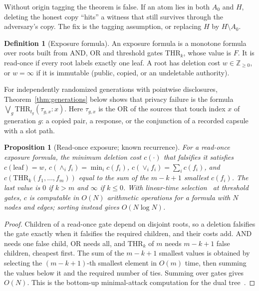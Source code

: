 \documentclass[pdflatex,sn-mathphys-num]{sn-jnl}
\theoremstyle{plain}
\newtheorem{proposition}[theorem]{Proposition}
\theoremstyle{definition}
\newtheorem{definition}[theorem]{Definition}
\begin{document}
Without origin tagging the theorem is false. If an atom lies in both $A_0$ and $H$, deleting the honest copy ``hits'' a witness that still survives through the adversary's copy. The fix is the tagging assumption, or replacing $H$ by $H\setminus A_0$.

\begin{definition}[Exposure formula]
An exposure formula is a monotone formula over roots built from AND, OR and threshold gates $\mathrm{THR}_k$, whose value is $F$. It is read-once if every root labels exactly one leaf. A root has deletion cost $w\in\mathbb{Z}_{\ge0}$, or $w=\infty$ if it is immutable (public, copied, or an undeletable authority).
\end{definition}

For independently randomized generations with pointwise disclosures, Theorem~\ref{thm:generations} below shows that privacy failure is the formula $\bigvee_g\mathrm{THR}_{t_g}(\tau_{g,x}:x)$. Here $\tau_{g,x}$ is the OR of the sources that touch index $x$ of generation $g$: a copied pair, a response, or the conjunction of a recorded capsule with a slot path.

\begin{proposition}[Read-once exposure; known recurrence]\label{prop:readonce}
For a read-once exposure formula, the minimum deletion cost $c(\cdot)$ that falsifies it satisfies $c(\text{leaf})=w$, $c(\wedge_i f_i)=\min_i c(f_i)$, $c(\vee_i f_i)=\sum_i c(f_i)$, and $c(\mathrm{THR}_k(f_1,\dots,f_m))$ equal to the sum of the $m-k+1$ smallest $c(f_i)$. The last value is $0$ if $k>m$ and $\infty$ if $k\le0$. With linear-time selection~\cite{blum1973} at threshold gates, $c$ is computable in $O(N)$ arithmetic operations for a formula with $N$ nodes and edges; sorting instead gives $O(N\log N)$.
\end{proposition}
\begin{proof}
Children of a read-once gate depend on disjoint roots, so a deletion falsifies the gate exactly when it falsifies the required children, and their costs add. AND needs one false child, OR needs all, and $\mathrm{THR}_k$ of $m$ needs $m-k+1$ false children, cheapest first. The sum of the $m-k+1$ smallest values is obtained by selecting the $(m-k+1)$-th smallest element in $O(m)$ time, then summing the values below it and the required number of ties. Summing over gates gives $O(N)$. This is the bottom-up minimal-attack computation for the dual tree~\cite{mauw2005,lopuhaa2022}.
\end{proof}
\end{document}
